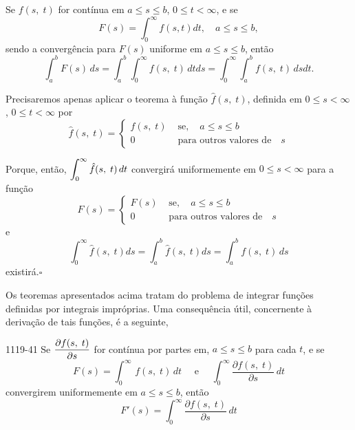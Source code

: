 \begin{coro} Se $f(s,\; t)$ for contínua em $a \leq s \leq b$, $0 \leq t <\infty$, e se
\begin{equation*}
  F(s)=\int_0^\infty f(s, t) dt, \quad a \leq  s \leq  b,
\end{equation*}
sendo a convergência para $F(s)$ uniforme em $ a \leq s \leq b$, então
\begin{equation*}
\int_a^b F(s)\, ds = \int_a^b\int_0^\infty f(s,\; t)\,dtds
=\int_0^\infty \int_a^b f(s,\; t)\, dsdt.
\end{equation*}
\end{coro}

\prova Precisaremos apenas aplicar o teorema à função
$\hat{f}(s,\; t)$, definida em $0 \leq s < \infty$, $0 \leq t<\infty$
por
\begin{equation*}
 \hat{f}(s,\; t)=
  \begin{cases}
    f(s,\; t) & \text{ se},\quad a\leq s\leq b \\[2ex]
    0 & \text{ para outros valores de} \quad s
  \end{cases}
\end{equation*}

Porque, então, $\displaystyle{\int_0^\infty\hat{f}(s,\; t)\, dt}$  convergirá
uniformemente em $0 \leq s <\infty$  para a função
\begin{equation*}
 \hat{F}(s)=
  \begin{cases}
    F(s) & \text{ se},\quad a\leq s\leq b \\[2ex]
    0 & \text{ para outros valores de} \quad s
  \end{cases}
\end{equation*}
e
\begin{equation*}
  \int_0^\infty\hat{f}(s,\; t)ds=\int_a^b\hat{f}(s,\; t)ds=\int_a^b f(s,\; t)\, ds
\end{equation*}
existirá.\hfill $\square$

Os teoremas apresentados acima tratam do problema de integrar
funções definidas por integrais impróprias. Uma consequência útil,
concernente à derivação de tais funções, é a seguinte,
\begin{theoc}{}{1119-41}
Se $\displaystyle{\frac{\partial f(s,\; t)}{\partial s}}$ for contínua por
partes em, $a \leq s \le b$ para cada $t$, e se
\begin{equation*}
F(s)=\int_0^\infty\,f(s,\; t)\,dt \quad \text{ e }\quad
\int_0^\infty \frac{\partial f(s,\; t)}{\partial s}\, dt
\end{equation*}
convergirem uniformemente em $a \leq s \leq b$, então
\begin{equation*}
  F'(s)=\int_0^\infty \frac{\partial f(s,\; t)}{\partial s}\, dt
\end{equation*}
\end{theoc}


